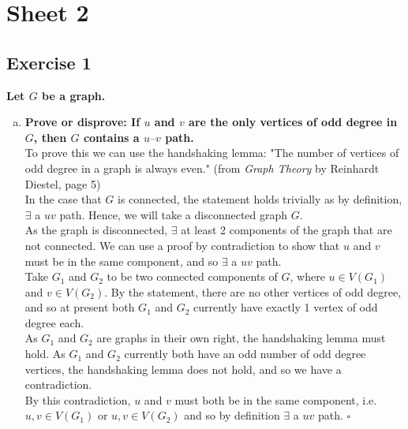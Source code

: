 \section*{Sheet 2}
\subsection*{Exercise 1}
\boldmath
\textbf{Let $G$ be a graph.}
\begin{enumerate}[a)]
    \item \textbf{Prove or disprove: If $u$ and $v$ are the only vertices of odd degree in $G$, then $G$ contains a $u–v$ path.} 
    \unboldmath
    \\
    \linebreak 
    To prove this we can use the handshaking lemma: "The number of vertices of odd degree in a graph is always even." (from \textit{Graph Theory} by Reinhardt Diestel, page 5)\\
    \linebreak 
    In the case that $G$ is connected, the statement holds trivially as by definition, $\exists$ a $uv$ path. Hence, we will take a disconnected graph $G$. \\
    \linebreak 
    As the graph is disconnected, $\exists $ at least 2 components of the graph that are not connected. We can use a proof by contradiction to show that $u$ and $v$ must be in the same component, and so $\exists$ a $uv$ path. \\
    \linebreak
    Take $G_1$ and $G_2$ to be two connected components of $G$, where $u \in V(G_1)$ and $v \in V(G_2)$. By the statement, there are no other vertices of odd degree, and so at present both $G_1$ and $G_2$ currently have exactly 1 vertex of odd degree each. \\
    \linebreak 
    As $G_1$ and $G_2$ are graphs in their own right, the handshaking lemma must hold. As $G_1$ and $G_2$ currently both have an odd number of odd degree vertices, the handshaking lemma does not hold, and so we have a contradiction. \\
    \linebreak 
    By this contradiction, $u$ and $v$ must both be in the same component, i.e. $u, v \in V(G_1)$ or $u, v \in V(G_2)$ and so by definition $\exists$ a $uv$ path. \hspace{10mm} $\square$ \\

\end{enumerate}
